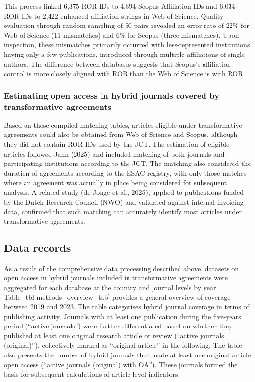 \documentclass[a4paper,man,floatsintext,longtable,noextraspace,10pt]{apa6}
\begin{document}
This process linked 6,375 ROR-IDs to 4,894 Scopus Affiliation IDs and
6,034 ROR-IDs to 2,422 enhanced affiliation strings in Web of Science.
Quality evaluation through random sampling of 50 pairs revealed an error
rate of 22\% for Web of Science (11 mismatches) and 6\% for Scopus
(three mismatches). Upon inspection, these mismatches primarily occurred
with less-represented institutions having only a few publications,
introduced through multiple affiliations of single authors. The
difference between databases suggests that Scopus's affiliation control
is more closely aligned with ROR than the Web of Science is with ROR.

\subsubsection{Estimating open access in hybrid journals covered by
transformative
agreements}\label{estimating-open-access-in-hybrid-journals-covered-by-transformative-agreements}

Based on these compiled matching tables, articles eligible under
transformative agreements could also be obtained from Web of Science and
Scopus, although they did not contain ROR-IDs used by the JCT. The
estimation of eligible articles followed Jahn (2025) and included
matching of both journals and participating institutions according to
the JCT. The matching also considered the duration of agreements
according to the ESAC registry, with only those matches where an
agreement was actually in place being considered for subsequent
analysis. A related study (de Jonge et al., 2025), applied to
publications funded by the Dutch Research Council (NWO) and validated
against internal invoicing data, confirmed that such matching can
accurately identify most articles under transformative agreements.

\subsection{Data records}\label{data-records}

As a result of the comprehensive data processing described above,
datasets on open access in hybrid journals included in transformative
agreements were aggregated for each database at the country and journal
levels by year. Table~\ref{tbl-methods_overview_tab} provides a general
overview of coverage between 2019 and 2023. The table categorises hybrid
journal coverage in terms of publishing activity. Journals with at least
one publication during the five-years period (``active journals'') were
further differentiated based on whether they published at least one
original research article or review (``active journals (original)''),
collectively marked as ``original article'' in the following. The table
also presents the number of hybrid journals that made at least one
original article open access (``active journals (original) with OA'').
These journals formed the basis for subsequent calculations of
article-level indicators.
\end{document}
